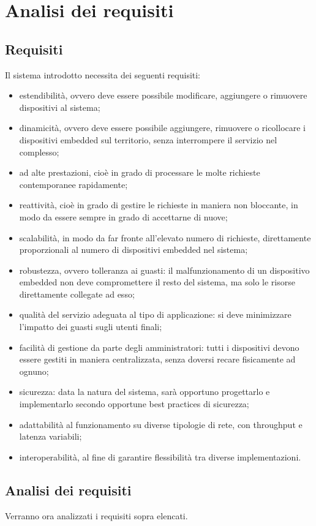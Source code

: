 \chapter{Analisi dei requisiti}

\section{Requisiti}

Il sistema introdotto necessita dei seguenti requisiti:
\begin{itemize}
 \item estendibilità, ovvero deve essere possibile modificare, aggiungere o rimuovere dispositivi al sistema;
 \item dinamicità, ovvero deve essere possibile aggiungere, rimuovere o ricollocare i dispositivi embedded sul territorio, senza interrompere il servizio nel complesso;
 \item ad alte prestazioni, cioè in grado di processare le molte richieste contemporanee rapidamente;
 \item reattività, cioè in grado di gestire le richieste in maniera non bloccante, in modo da essere sempre in grado di accettarne di nuove;
 \item scalabilità, in modo da far fronte all’elevato numero di richieste, direttamente proporzionali al numero di dispositivi embedded nel sistema;
 \item robustezza, ovvero tolleranza ai guasti: il malfunzionamento di un dispositivo embedded non deve compromettere il resto del sistema, ma solo le risorse direttamente collegate ad esso;
 \item qualità del servizio adeguata al tipo di applicazione: si deve minimizzare l'impatto dei guasti sugli utenti finali;
 \item facilità di gestione da parte degli amministratori: tutti i dispositivi devono essere gestiti in maniera centralizzata, senza doversi recare fisicamente ad ognuno;
 \item sicurezza: data la natura del sistema, sarà opportuno progettarlo e implementarlo secondo opportune best practices di sicurezza;
 \item adattabilità al funzionamento su diverse tipologie di rete, con throughput e latenza variabili;
 \item interoperabilità, al fine di garantire flessibilità tra diverse implementazioni.
\end{itemize}


\section{Analisi dei requisiti}
Verranno ora analizzati i requisiti sopra elencati.

